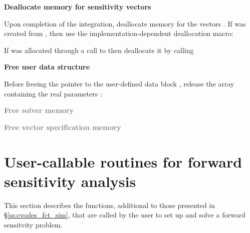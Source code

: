 \begin{Steps}
\item 
  {\bf Deallocate memory for sensitivity vectors}

  Upon completion of the integration, deallocate memory for the vectors . 
  If  was created from , then use the implementation-dependent 
  {\nvector} deallocation macro:

  {\s} 

  {\p} 

  If  was allocated through a call to  then deallocate
  it by calling 
  
\item
  {\bf Free user data structure}

  Before freeing the pointer to the user-defined data block 
  , release the array containing the real parameters :

\item
  \textcolor{gray}{\bf Free solver memory}
  
\item
  \textcolor{gray}{\bf Free vector specification memory}

\end{Steps}

\section{User-callable routines for forward sensitivity analysis}

This section describes the {\cvodes} functions, additional to those presented
in \S\ref{ss:cvodes_fct_sim}, that are called by the user to set up and solve
a forward sensitvity problem.

